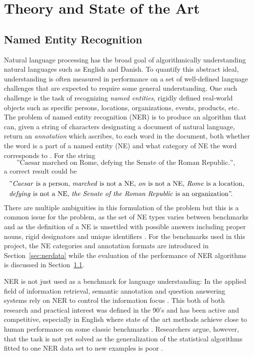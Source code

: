 \documentclass[main.tex]{subfiles}
\begin{document}
\chapter{Theory and State of the Art}
\label{chap:theory}

\section{Named Entity Recognition}
Natural language processing has the broad goal of algorithmically understanding natural languages such as English and Danish.
To quantify this abstract ideal, understanding is often measured in performance on a set of well-defined language challenges that are expected to require some general understanding.
One such challenge is the task of recognizing \emph{named entities}, rigidly defined real-world objects such as specific persons, locations, organizations, events, products, etc.
The problem of named entity recognition (NER) is to produce an algorithm that can, given a string of characters designating a document of natural language, return an \emph{annotation} which ascribes, to each word in the document, both whether the word is a part of a named entity (NE) and what category of NE the word corresponds to \cite{wiki2021ner}.
For the string
\[
    \text{
        ''Caesar marched on Rome, defying the Senate of the Roman Republic.'',
    }
\]
a correct result could be
\begin{align*}
    & \text{
        ''\emph{Caesar} is a person,
        \emph{marched} is not a NE,
        \emph{on} is not a NE,
        \emph{Rome} is a location,
    }\\
    &\text{
        \emph{defying} is not a NE,
        \emph{the Senate of the Roman Republic} is an organization''.
    }
\end{align*}
There are multiple ambiguities in this formulation of the problem but this is a common issue for the problem, as the set of NE types varies between benchmarks and as the definition of a NE is unsettled with possible answers including proper nouns, rigid designators and unique identifiers \cite[Sec. 4]{marrero2013ner}.
For the benchmarks used in this project, the NE categories and annotation formats are introduced in Section~\ref{sec:nerdata} while the evaluation of the performance of NER algorithms is discussed in Section~\ref{}.

NER is not just used as a benchmark for language understanding:
In the applied field of information retrieval, semantic annotation and question answering systems rely on NER to control the information focus \cite[Sec. 2]{marrero2013ner}.
This both of both research and practical interest was defined in the 90's and has been active and competitive, especially in English where state of the art methods achieve close to human performance on some classic benchmarks \cite{wiki2021ner, marrero2013ner}.
Researchers argue, however, that the task is not yet solved as the generalization of the statistical algorithms fitted to one NER data set to new examples is poor \cite[Sec. 7.2]{marrero2013ner}.
\end{document}
